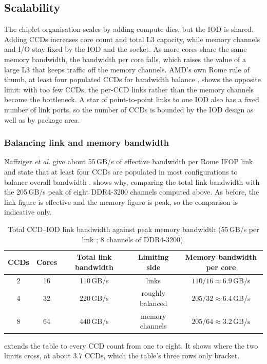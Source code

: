 \subsection{Scalability}
The chiplet organisation scales by adding compute dies, but the IOD is shared. Adding CCDs increases core count and total L3 capacity, while memory channels and I/O stay fixed by the IOD and the socket. As more cores share the same memory bandwidth, the bandwidth per core falls, which raises the value of a large L3 that keeps traffic off the memory channels. AMD's own Rome rule of thumb, at least four populated CCDs for bandwidth balance \cite{naffziger2020chiplet}, shows the opposite limit: with too few CCDs, the per-CCD links rather than the memory channels become the bottleneck. A star of point-to-point links to one IOD also has a fixed number of link ports, so the number of CCDs is bounded by the IOD design as well as by package area.

\subsubsection*{Balancing link and memory bandwidth}
\label{sec:bandwidth-example}
Naffziger \emph{et al.} give about 55\,GB/s of effective bandwidth per Rome IFOP link and state that at least four CCDs are populated in most configurations to balance overall bandwidth \cite{naffziger2020chiplet}.  shows why, comparing the total link bandwidth with the 205\,GB/s peak of eight DDR4-3200 channels computed above. As before, the link figure is effective and the memory figure is peak, so the comparison is indicative only.

\begin{table}[htbp]
  \centering
  \caption[Total CCD--IOD link bandwidth against peak memory bandwidth]{Total CCD--IOD link bandwidth against peak memory bandwidth (55\,GB/s per link \cite{naffziger2020chiplet}; 8 channels of DDR4-3200).}
  \label{tab:bandwidth-balance}
  \small
  \begin{tabular}{@{}ccccc@{}}
    \toprule
    \textbf{CCDs} & \textbf{Cores} & \textbf{Total link bandwidth} & \textbf{Limiting side} & \textbf{Memory bandwidth per core} \\
    \midrule
    2 & 16 & 110\,GB/s & links & $110/16 \approx 6.9$\,GB/s \\
    4 & 32 & 220\,GB/s & roughly balanced & $205/32 \approx 6.4$\,GB/s \\
    8 & 64 & 440\,GB/s & memory channels & $205/64 \approx 3.2$\,GB/s \\
    \bottomrule
  \end{tabular}
\end{table}
 extends the table to every CCD count from one to eight. It shows where the two limits cross, at about 3.7 CCDs, which the table's three rows only bracket.

